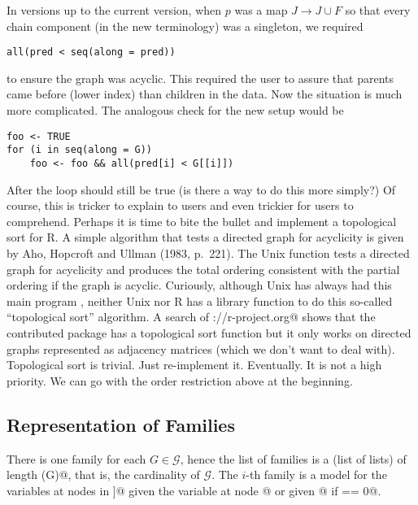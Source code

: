 \documentclass[11pt]{article}
\begin{document}
In versions up to the current version, when $p$ was a map $J \to J \cup F$
so that every chain component (in the new terminology) was a singleton,
we required
\begin{verbatim}
all(pred < seq(along = pred))
\end{verbatim}
to ensure the graph was acyclic.  This required the user to assure
that parents came before (lower index) than children in the data.
Now the situation is much more complicated.  The analogous check for
the new setup would be
\begin{verbatim}
foo <- TRUE
for (i in seq(along = G))
    foo <- foo && all(pred[i] < G[[i]])
\end{verbatim}
After the loop \verb@foo@ should still be true (is there a way to do this
more simply?)  Of course, this is tricker to explain to users and even
trickier for users to comprehend.  Perhaps it is time to bite the bullet
and implement a topological sort for R.
A simple algorithm that tests a directed graph for acyclicity is given
by Aho, Hopcroft and Ullman (1983, p.~221).
The Unix function \verb@tsort@ tests a directed graph for acyclicity
and produces the total ordering consistent with the partial ordering
if the graph is acyclic.  Curiously, although Unix has always had
this main program \verb@tsort@, neither Unix nor R has a library
function to do this so-called ``topological sort'' algorithm.
A search of \verb@http://r-project.org@ shows that the contributed package
\verb@ggm@ has a topological sort function \verb@topSort@ but it only
works on directed graphs represented as adjacency matrices (which we don't
want to deal with).  Topological sort is trivial.  Just re-implement it.
Eventually.  It is not a high priority.  We can go with the order restriction
above at the beginning.

\subsection{Representation of Families} \label{sec:multi-fam}

There is one family for each $G \in \mathcal{G}$, hence the list of families
is a (list of lists) of length \verb@length(G)@, that is, the cardinality
of $\mathcal{G}$.  The $i$-th family is a model for the variables at nodes
in \verb@G[[i]]@ given the variable at node \verb@pred[i]@ or given
\verb@root[i]@ if \verb@pred[i] == 0@.
\end{document}
